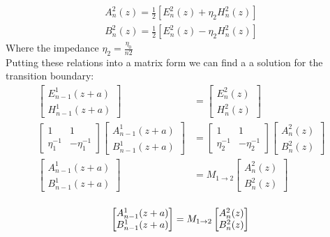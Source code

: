 \begin{equation}
	\begin{aligned}
		A^2_n(z) = \frac{1}{2}[E^2_n(z) + \eta_2 H^2_n(z)]\\
		B^2_n(z) = \frac{1}{2}[E^2_n(z) - \eta_2 H^2_n(z)]
	\end{aligned}
\end{equation}
Where the impedance $\eta_2 = \frac{\eta_0}{n2}$ \\
Putting these relations into a matrix form we can find a a solution for the transition boundary:
\begin{equation*}
	\begin{aligned}
		\begin{bmatrix}E^1_{n-1}(z+a)\\H^1_{n-1}(z+a) \end{bmatrix} 
		&= \begin{bmatrix}E^2_n(z)\\H^2_n(z) \end{bmatrix}\\
		\begin{bmatrix}1 & 1\\\eta_1^{-1} & -\eta_1^{-1}\end{bmatrix}\begin{bmatrix}A^1_{n-1}(z+a)\\B^1_{n-1}(z+a) \end{bmatrix}
		&=\begin{bmatrix}1 & 1\\\eta_2^{-1} & -\eta_2^{-1}\end{bmatrix}\begin{bmatrix}A^2_n(z)\\B^2_n(z) \end{bmatrix} \\
		\begin{bmatrix}A^1_{n-1}(z+a)\\B^1_{n-1}(z+a) \end{bmatrix}
		&= M_{1\rightarrow2}\begin{bmatrix}A^2_n(z)\\B^2_n(z) \end{bmatrix}\\
	\end{aligned}
\end{equation*}

\begin{equation}
	\begin{bmatrix}A^1_{n-1}(z+a)\\B^1_{n-1}(z+a) \end{bmatrix}
	= M_{1\rightarrow2}\begin{bmatrix}A^2_n(z)\\B^2_n(z) \end{bmatrix}\\
\end{equation}

